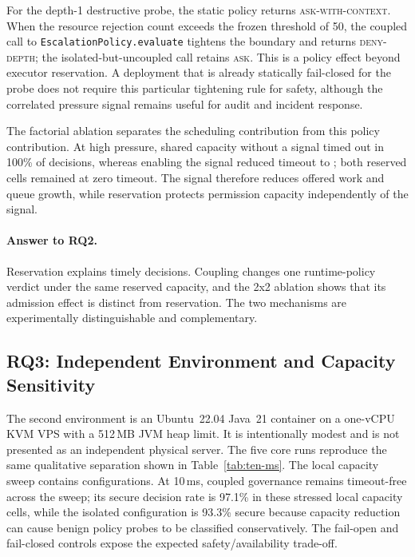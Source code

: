 For the depth-1 destructive probe, the static policy returns
\textsc{ask-with-context}. When the resource rejection count exceeds the
frozen threshold of 50, the coupled call to
\texttt{EscalationPolicy.evaluate} tightens the boundary and returns
\textsc{deny-depth}; the isolated-but-uncoupled call retains \textsc{ask}.
This is a policy effect beyond executor reservation. A deployment that is
already statically fail-closed for the probe does not require this particular
tightening rule for safety, although the correlated pressure signal remains
useful for audit and incident response.

The factorial ablation separates the scheduling contribution from this policy
contribution. At high pressure, shared capacity without a signal timed out in
100\% of decisions, whereas enabling the signal reduced timeout to
\CCPEAblationHighSharedSignalTimeout{}; both reserved cells remained at zero
timeout. The signal therefore reduces offered work and queue growth, while
reservation protects permission capacity independently of the signal.

\paragraph{Answer to RQ2.}
Reservation explains timely decisions. Coupling changes one runtime-policy
verdict under the same reserved capacity, and the 2x2 ablation shows that its
admission effect is distinct from reservation. The two mechanisms are
experimentally distinguishable and complementary.

\subsection{RQ3: Independent Environment and Capacity Sensitivity}
\label{sec:eval-threshold}

The second environment is an Ubuntu~22.04 Java~21 container on a one-vCPU KVM
VPS with a 512\,MB JVM heap limit. It is intentionally modest and is not
presented as an independent physical server. The five core runs reproduce the
same qualitative separation shown in Table~\ref{tab:ten-ms}. The local
capacity sweep contains \ComputingCapacityConfigCount{} configurations. At
10\,ms, coupled governance remains timeout-free across the sweep; its secure
decision rate is 97.1\% in these stressed local capacity cells, while the
isolated configuration is 93.3\% secure because capacity reduction can cause
benign policy probes to be classified conservatively. The fail-open and
fail-closed controls expose the expected safety/availability trade-off.

